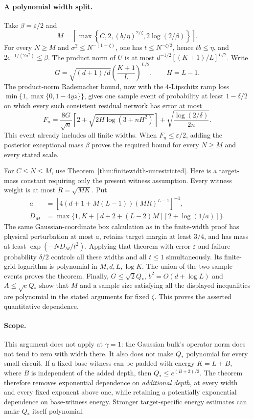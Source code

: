 \paragraph{A polynomial width split.}
Take $\beta=\varepsilon/2$ and
\[
 M=\left\lceil\max\left\{C,2,(b/\eta)^{2/\zeta},
                                      2\log(2/\beta)\right\}\right\rceil.
\]
For every $N\ge M$ and $\sigma^2\le N^{-(1+\zeta)}$, one has
$t\le N^{-\zeta/2}$, hence $tb\le\eta$, and
$2e^{-1/(2\sigma^2)}\le\beta$.
The product norm of $U$ is at most
$d^{-1/2}[(K+1)/L]^{L/2}$. Write
\[
 G=\sqrt{(d+1)/d}\left(\frac{K+1}{L}\right)^{L/2},\qquad H=L-1.
\]
The product-norm Rademacher bound, now with the $4$-Lipschitz ramp loss
$\min\{1,\max\{0,1-4yz\}\}$, gives one sample event of probability at
least $1-\delta/2$ on which every such consistent residual network has
error at most
\begin{equation}\label{eq:distance-sample-bound}
 F_n=\frac{8G}{\sqrt n}\left[2+\sqrt{2H\log(3+nH^2)}\right]
                     +\sqrt{\frac{\log(2/\delta)}{2n}}.
\end{equation}
This event already includes all finite widths. When $F_n\le\varepsilon/2$,
adding the posterior exceptional mass $\beta$ proves the required bound
for every $N\ge M$ and every stated scale.

For $C\le N\le M$, use Theorem~\ref{thm:finitewidth-unrestricted}.
Here is a target-mass constant requiring only the present witness assumption.
Every witness weight is at most $R=\sqrt{MK}$. Put
\begin{align*}
 a&=[4(d+1+M(L-1))(MR)^{L-1}]^{-1},\\
 D_M&=\max\{1,K+[d+2+(L-2)M][2+\log(1/a)]\}.
\end{align*}
The same Gaussian-coordinate box calculation as in the finite-width proof
has physical perturbation at most $a$, retains target margin at least $3/4$,
and has mass at least $\exp(-ND_M/t^2)$.
Applying that theorem with error $\varepsilon$ and failure probability
$\delta/2$ controls all these widths and all $t\le1$ simultaneously.
Its finite-grid logarithm is polynomial in $M,d,L,\log K$.
The union of the two sample events proves the theorem.
Finally, $G\le\sqrt2 Q_*$, $b^2=O(d+\log L)$ and
$A\le\sqrt e Q_*$ show that $M$ and a sample size satisfying all the
displayed inequalities are polynomial in the stated arguments for fixed
$\zeta$. This proves the asserted quantitative dependence.

\paragraph{Scope.}
This argument does not apply at $\gamma=1$: the Gaussian bulk's operator
norm does not tend to zero with width there. It also does not make $Q_*$
polynomial for every small circuit. If a fixed base witness can be padded
with energy $K=L+B$, where $B$ is independent of the added depth, then
$Q_*\le e^{(B+2)/2}$. The theorem therefore removes exponential dependence
on \emph{additional depth}, at every width and every fixed exponent above
one, while retaining a potentially exponential dependence on base-witness
energy. Stronger target-specific energy estimates can make $Q_*$ itself
polynomial.
